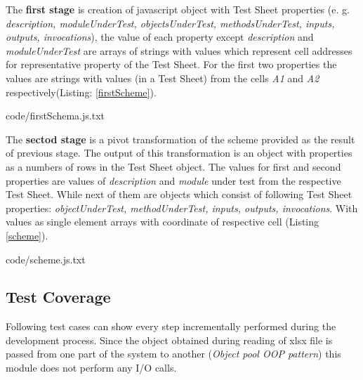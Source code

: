The \textbf{first stage} is creation of javascript object with Test Sheet properties (e. g. \textit{description, moduleUnderTest, objectsUnderTest, methodsUnderTest, inputs, outputs, invocations}), the value of each property except \textit{description} and \textit{moduleUnderTest} are arrays of strings with values which represent cell addresses for representative property of the Test Sheet. For the first two properties the values are strings with values (in a Test Sheet) from the cells \textit{A1} and \textit{A2} respectively(Listing: \ref{firstScheme}).


{code/firstSchema.js.txt}

The \textbf{sectod stage} is a pivot transformation of the scheme provided as the result of previous stage. The output of this transformation is an object with properties as a numbers of rows in the Test Sheet object. The values for first and second properties are values of \textit{description} and \textit{module} under test from the respective Test Sheet. While next of them are objects which consist of following Test Sheet properties: \textit{objectUnderTest, methodUnderTest, inputs, outputs, invocations}. With values as single element arrays with coordinate of respective cell (Listing \ref{scheme}).

{code/scheme.js.txt}

%
\subsection{Test Coverage}
Following test cases can show every step incrementally performed during the development process. Since the object obtained during reading of xlsx file is passed from one part of the system to another (\textit{Object pool OOP pattern}) this module does not perform any I/O calls.
%

